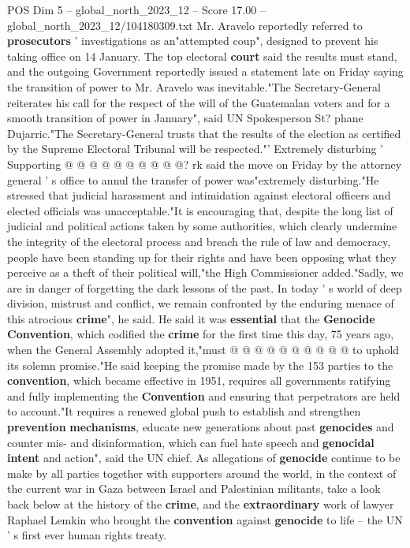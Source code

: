 \begin{textsample}{POS Dim 5 – global\_north\_2023\_12 – Score 17.00 – global\_north\_2023\_12/104180309.txt}
Mr.
Aravelo reportedly referred to \textbf{prosecutors} ' investigations as an"attempted coup", designed to prevent his taking office on 14 January.
The top electoral \textbf{court} said the results must stand, and the outgoing Government reportedly issued a statement late on Friday saying the transition of power to Mr.
Aravelo was inevitable."The Secretary-General reiterates his call for the respect of the will of the Guatemalan voters and for a smooth transition of power in January", said UN Spokesperson St? phane Dujarric."The Secretary-General trusts that the results of the election as certified by the Supreme Electoral Tribunal will be respected."' Extremely disturbing ' Supporting @ @ @ @ @ @ @ @ @ @? rk said the move on Friday by the attorney general ' s office to annul the transfer of power was"extremely disturbing."He stressed that judicial harassment and intimidation against electoral officers and elected officials was unacceptable."It is encouraging that, despite the long list of judicial and political actions taken by some authorities, which clearly undermine the integrity of the electoral process and breach the rule of law and democracy, people have been standing up for their rights and have been opposing what they perceive as a theft of their political will,"the High Commissioner added."Sadly, we are in danger of forgetting the dark lessons of the past.
In today ' s world of deep division, mistrust and conflict, we remain confronted by the enduring menace of this atrocious \textbf{crime}", he said.
He said it was \textbf{essential} that the \textbf{Genocide} \textbf{Convention}, which codified the \textbf{crime} for the first time this day, 75 years ago, when the General Assembly adopted it,"must @ @ @ @ @ @ @ @ @ @ to uphold its solemn promise."He said keeping the promise made by the 153 parties to the \textbf{convention}, which became effective in 1951, requires all governments ratifying and fully implementing the \textbf{Convention} and ensuring that perpetrators are held to account."It requires a renewed global push to establish and strengthen \textbf{prevention} \textbf{mechanisms}, educate new generations about past \textbf{genocides} and counter mis- and disinformation, which can fuel hate speech and \textbf{genocidal} \textbf{intent} and action", said the UN chief.
As allegations of \textbf{genocide} continue to be make by all parties together with supporters around the world, in the context of the current war in Gaza between Israel and Palestinian militants, take a look back below at the history of the \textbf{crime}, and the \textbf{extraordinary} work of lawyer Raphael Lemkin who brought the \textbf{convention} against \textbf{genocide} to life -- the UN ' s first ever human rights treaty.

\end{textsample}
